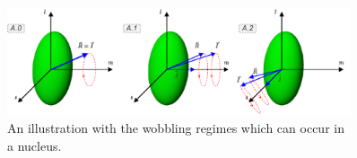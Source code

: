 \documentclass[final]{beamer}
\newlength{\sepwidth}
\newlength{\colwidth}
\newcommand{\separatorcolumn}{\begin{column}{\sepwidth}\end{column}}
\begin{document}
\begin{frame}[t]
\begin{columns}[t]
\begin{column}{\colwidth}
\end{column}

\separatorcolumn

\begin{column}{\colwidth}

\begin{figure}
      \centering
      \includegraphics[scale=1.55]{images/wobbling_Regimes_COUPLING_SCHEME.pdf}
      \caption{An illustration with the wobbling regimes which can occur in a nucleus.}
      \label{wobbling-regimes}
  \end{figure}



\end{column}
\end{columns}
\end{frame}
\end{document}

